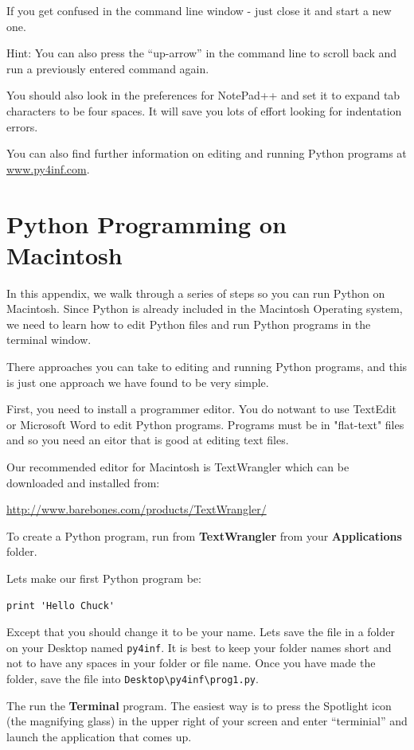 \documentclass[10pt]{book}
\begin{document}
If you get confused in the command line window - just close it
and start a new one.

Hint: You can also press the ``up-arrow'' in the command line to 
scroll back and run a previously entered command again.

You should also look in the preferences for NotePad++ and set it 
to expand tab characters to be four spaces.  It will save you lots
of effort looking for indentation errors.

You can also find further information on editing and running 
Python programs at \url{www.py4inf.com}.

\chapter{Python Programming on Macintosh}

In this appendix, we walk through a series of steps
so you can run Python on Macintosh.  Since Python is
already included in the Macintosh Operating system, we need to 
learn how to edit Python files and run Python programs
in the terminal window.

There approaches you can take to editing and running
Python programs, and this is just one
approach we have found to be very simple.

First, you need to install a programmer editor.  You
do notwant to use TextEdit or Microsoft Word to edit
Python programs.  Programs must be in "flat-text" files
and so you need an eitor that is good at
editing text files.

Our recommended editor for Macintosh is TextWrangler which
can be downloaded and installed from:

\url{http://www.barebones.com/products/TextWrangler/}

To create a Python program, run from 
{\bf TextWrangler} from your {\bf Applications} folder.

Lets make our first Python program be:

\beforeverb
\begin{verbatim}
print 'Hello Chuck'
\end{verbatim}
\afterverb
%
Except that you should change it to be your name.  
Lets save the file in a folder on your Desktop named 
{\tt py4inf}.  It is best to keep your folder names short
and not to have any spaces in your folder or file name.
Once you have made the folder, save the file 
into {\tt Desktop{\textbackslash}py4inf{\textbackslash}prog1.py}.

The run the {\bf Terminal} program.  The easiest way is to 
press the Spotlight icon (the magnifying glass) in the upper
right of your screen and enter ``terminial'' and launch the
application that comes up.
\end{document}

